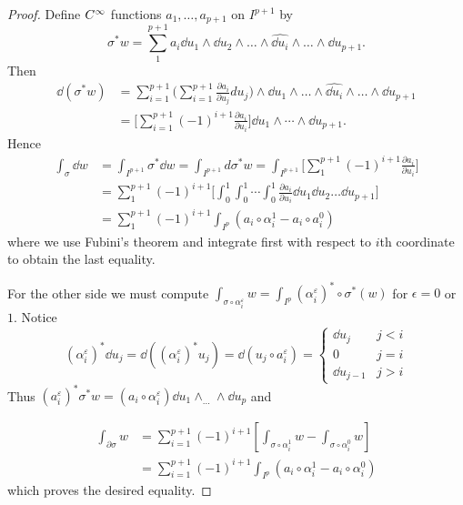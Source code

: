 \documentclass[../main]{subfiles}
\begin{document}
\begin{proof}
Define $C^\infty$ functions $a_{1}, \ldots, a_{p+1}$ on $I^{p+1}$ by \[\sigma^\ast w=\sum_1^{p + 1} a_{i} \dd u_{1} \wedge \dd u_2 \wedge \ldots \wedge \widehat {\dd u_i} \wedge \ldots \wedge \dd u_{p + 1}.\] Then
\begin{align*}
\dd(\sigma^\ast w) &= \sum_{i=1}^{p+1}\bigg(\sum_{i=1}^{p+1} \frac{\partial a_{i}}{\partial u_{j}} d u_{j}\bigg) \wedge \dd u_{1} \wedge \ldots \wedge \widehat {\dd u_i} \wedge \ldots \wedge \dd u_{p + 1} \\ &=\bigg[\sum_{i=1}^{p+1}(-1)^{i+1} \frac{\partial a_{i}}{\partial u_{i}}\bigg] \dd u_{1} \wedge \cdots \wedge \dd u_{p+1}.
\end{align*}
Hence
\begin{align*}
\int_{\sigma} \dd w & = \int_{I^{p+1}} \sigma^\ast \dd w = \int_{I^{p+1}} d \sigma^\ast w = \int_{I^{p+1}}\bigg[\sum_1^{p + 1} (-1)^{i + 1} \frac{\partial a_{i}}{\partial u_{i}}\bigg] \\ & = \sum_{1}^{p+1}(-1)^{i+1}\bigg[\int_{0}^{1} \int_{0}^{1} \cdots \int_{0}^{1} \frac{\partial a_{i}}{\partial u_{i}} \dd u_{1} \dd u_{2} \ldots \dd u_{p+1}\bigg] \\ & = \sum_{1}^{p+1}(-1)^{i+1} \int_{I^{p}}\left(a_{i} \circ \alpha_{i}^{1}-a_{i} \circ a_{i}^{0}\right)
\end{align*}
where we use Fubini's theorem and integrate first with respect to $i$th coordinate to obtain the last equality.

For the other side we must compute $\displaystyle\int_{\sigma \circ \alpha_{i}^{\varepsilon}}w=\int_{I^{p}}(\alpha_{i}^{\varepsilon})^\ast \circ \sigma^\ast(w)$ for $\epsilon=0$ or $1$. Notice \[(\alpha_{i}^{\varepsilon})^\ast \dd u_{j}=\dd((\alpha_{i}^{\varepsilon})^\ast u_{j})=\dd(u_{j} \circ a_{i}^{\varepsilon})=\begin{cases}\dd u_{j} & j<i \\ 0&j=i \\ \dd u_{j-1} & j>i \end{cases}\] Thus $\left(a_{i}^{\varepsilon}\right)^\ast \sigma^\ast w = \left(a_{i} \circ \alpha_{i}^{\varepsilon}\right) \dd u_{1} \wedge_{\ldots} \wedge \dd u_{p}$ and

\begin{align*}
\int_{\partial \sigma} w & = \sum_{i=1}^{p+1}(-1)^{i+1}\left[\int_{\sigma \circ \alpha_{i}^{1}} w-\int_{\sigma \circ \alpha_{i}^{0}} w\right] \\ & = \sum_{i=1}^{p+1}(-1)^{i+1} \int_{I^{p}}\left(a_{i} \circ \alpha_{i}^{1}-a_{i} \circ \alpha_{i}^{0}\right)
\end{align*}
which proves the desired equality.
\end{proof}
\end{document}

